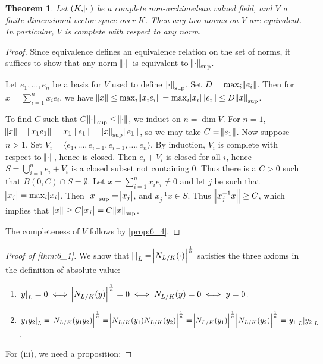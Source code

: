 \documentclass[11pt]{article}
\theoremstyle{definition}
\theoremstyle{plain}
\newtheorem{theorem}[definition]{Theorem}
\theoremstyle{remark}
\renewcommand{\qedsymbol}{$\blacksquare$}
\begin{document}
\begin{theorem}\label{thm:6_5}
    Let $(K, \abs{\cdot})$ be a complete non-archimedean valued field, and $V$ a finite-dimensional vector space over $K$. Then any two norms on $V$ are equivalent. In particular, $V$ is complete with respect to any norm.
\end{theorem}
\begin{proof}
    Since equivalence defines an equivalence relation on the set of norms, it suffices to show that any norm $\norm{\cdot}$ is equivalent to $\norm{\cdot}_\mathrm{sup}$.

    Let $e_1, \ldots, e_n$ be a basis for $V$ used to define $\norm{\cdot}_\mathrm{sup}$. Set $D = \max_i \norm{e_i}$. Then for $x = \sum_{i=1}^n x_i e_i$, we have $\norm{x} \le \max_i \norm{x_i e_i} = \max_i \abs{x_i} \norm{e_i} \le D \norm{x}_\mathrm{sup}$.

    To find $C$ such that $C \norm{\cdot}_\mathrm{sup} \le \norm{\cdot}$, we induct on $n = \dim{V}$. For $n = 1$, $\norm{x} = \norm{x_1 e_1} = \abs{x_1}\norm{e_1} = \norm{x}_\mathrm{sup} \norm{e_1}$, so we may take $C = \norm{e_1}$. Now suppose $n > 1$. Set $V_i = \langle e_1, \ldots, e_{i-1}, e_{i+1}, \ldots, e_n \rangle$. By induction, $V_i$ is complete with respect to $\norm{\cdot}$, hence is closed. Then $e_i + V_i$ is closed for all $i$, hence $S = \bigcup_{i=1}^n e_i + V_i$ is a closed subset not containing $0$. Thus there is a $C > 0$ such that $B(0, C) \cap S = \emptyset$. Let $x = \sum_{i=1}^n x_i e_i \neq 0$ and let $j$ be such that $\abs{x_j} = \max_i \abs{x_i}$. Then $\norm{x}_\mathrm{sup} = \abs{x_j}$, and $x_j^{-1} x \in S$. Thus $\norm{x_j^{-1} x} \ge C$, which implies that $\norm{x} \ge C \abs{x_j} = C \norm{x}_\mathrm{sup}$.

    The completeness of $V$ follows by \autoref{prop:6_4}.
\end{proof}

\begin{proof}[Proof of \autoref{thm:6_1}]
    We show that $\abs{\cdot}_L = \abs{N_{L/K}(\cdot)}^\frac{1}{n}$ satisfies the three axioms in the definition of absolute value:
    \begin{enumerate}
        \item $\abs{y}_L = 0 \iff \abs{N_{L/K}(y)}^\frac{1}{n} = 0 \iff N_{L/K}(y) = 0 \iff y = 0$.
        \item $\abs{y_1 y_2}_L = \abs{N_{L/K}(y_1 y_2)}^\frac{1}{n} = \abs{N_{L/K}(y_1) N_{L/K}(y_2)}^\frac{1}{n} = \abs{N_{L/K}(y_1)}^\frac{1}{n} \abs{N_{L/K}(y_2)}^\frac{1}{n} = \abs{y_1}_L \abs{y_2}_L$.
    \end{enumerate}
    For (iii), we need a proposition:
    \renewcommand*{\qedsymbol}{}
\end{proof}
\end{document}
